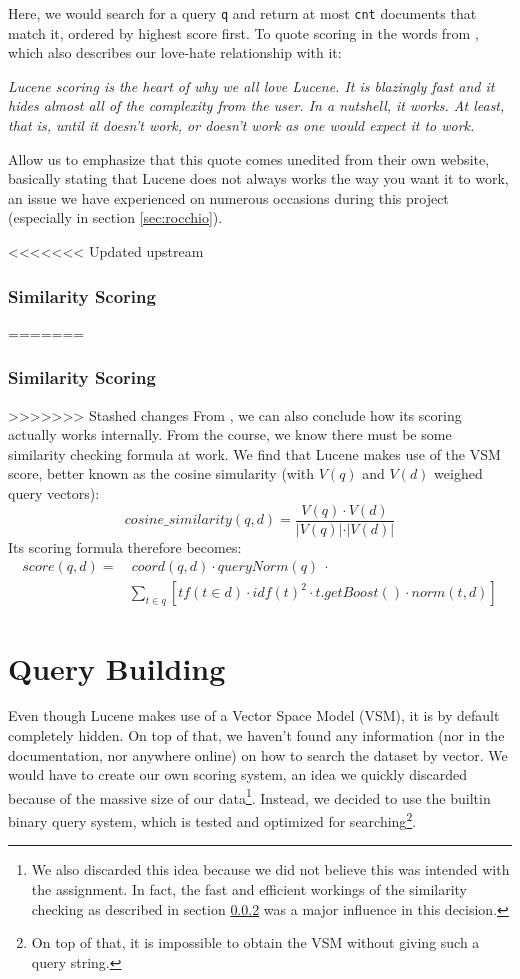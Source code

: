\documentclass[11pt]{article}
\begin{document}
Here, we would search for a query \texttt{q} and return at most \texttt{cnt} documents that match it, ordered by highest score first. To quote scoring in the words from \cite{lucene}, which also describes our love-hate relationship with it:
\begin{displayquote}
    \textsl{Lucene scoring is the heart of why we all love Lucene. It is blazingly fast and it hides almost all of the complexity from the user. In a nutshell, it works. At least, that is, until it doesn't work, or doesn't work as one would expect it to work.}
\end{displayquote}

Allow us to emphasize that this quote comes unedited from their own website, basically stating that Lucene does not always works the way you want it to work, an issue we have experienced on numerous occasions during this project (especially in section \ref{sec:rocchio}).

<<<<<<< Updated upstream
\subsubsection{Similarity Scoring}\label{sec:ss}
=======
\subsubsection{Similarity Scoring}\label{sec:sim}
>>>>>>> Stashed changes
From \cite{lucene}, we can also conclude how its scoring actually works internally. From the course, we know there must be some similarity checking formula at work. We find that Lucene makes use of the \textsf{VSM score}, better known as the \textsf{cosine simularity} (with $V(q)$ and $V(d)$ weighed query vectors):
$$cosine\_similarity(q, d) = \frac{V(q)\cdot V(d)}{\vert V(q)\vert\cdot\vert V(d)\vert}$$
Its scoring formula therefore becomes:
\begin{align*}
    score(q, d) =&\ coord(q, d)\cdot queryNorm(q)\ \cdot\\
    &\sum_{t \in q}\left[tf(t\in d)\cdot idf(t)^2 \cdot t.getBoost()\cdot norm(t, d)\right]
\end{align*}

\section{Query Building}\label{sec:query}
Even though Lucene makes use of a Vector Space Model (VSM), it is by default completely hidden. On top of that, we haven't found any information (nor in the documentation, nor anywhere online) on how to search the dataset by vector. We would have to create our own scoring system, an idea we quickly discarded because of the massive size of our data\footnote{We also discarded this idea because we did not believe this was intended with the assignment. In fact, the fast and efficient workings of the similarity checking as described in section \ref{sec:sim} was a major influence in this decision.}. Instead, we decided to use the builtin binary query system, which is tested and optimized for searching\footnote{On top of that, it is impossible to obtain the VSM without giving such a query string.}.
\end{document}

